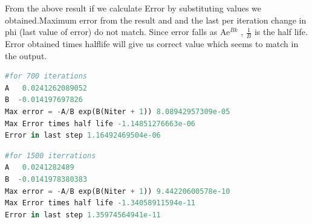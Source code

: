 \documentclass[a4paper]{article}
\begin{document}
From the above result if we calculate Error by substituting values we obtained.Maximum error from the result and and the last per iteration change in phi (last value of error) do not match.
Since error falls as Ae$^{Bk}$ , $\frac{1}{B}$ is the half life. Error obtained times halflife will give us correct value which seems to match in the output.
\begin{lstlisting}[language=Python]
#for 700 iterations
A   0.0241262089052
B  -0.014197697826
Max error = -A/B exp(B(Niter + 1)) 8.08942957309e-05
Max Error times half life -1.14851276663e-06
Error in last step 1.16492469504e-06
\end{lstlisting}
\begin{lstlisting}[language=Python]
#for 1500 iterrations
A   0.0241282489
B  -0.0141978380383
Max error = -A/B exp(B(Niter + 1)) 9.44220600578e-10
Max Error times half life -1.34058911594e-11
Error in last step 1.35974564941e-11

\end{lstlisting}
\end{document}
